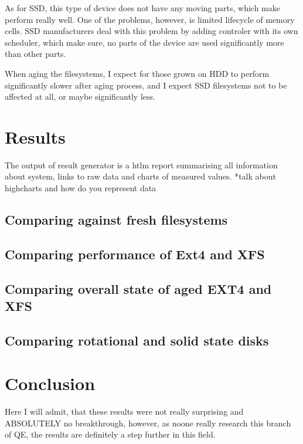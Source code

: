 \documentclass[
  color, %
  table, %
  lof,   %
  lot,   %
]{fithesis3}
\begin{document}
As for SSD, this type of device does not have any moving parts, which make perform really well. One of the problems, however, is limited lifecycle of memory cells. SSD manufacturers deal with this problem by adding controler with its own scheduler, which make sure, no parts of the device are used significantly more than other parts.

When aging the filesystems, I expect for those grown on HDD to perform significantly slower after aging process, and I expect SSD filesystems not to be affected at all, or maybe significantly less.

\chapter{Results}
The output of result generator is a htlm report summarising all information about system, links to raw data and charts of measured values.
*talk about highcharts and how do you represent data

\section{Comparing against fresh filesystems}
\section{Comparing performance of Ext4 and XFS}
\section{Comparing overall state of aged EXT4 and XFS}
\section{Comparing rotational and solid state disks}
\chapter{Conclusion}
Here I will admit, that these results were not really surprising and ABSOLUTELY no breakthrough, however, as noone really research this branch of QE, the results are definitely a step further in this field.
\end{document}
